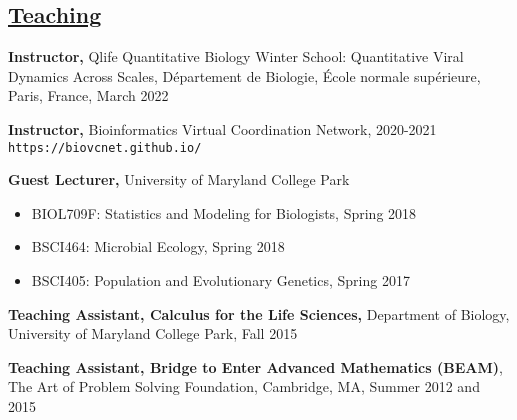 \documentclass[]{res}
\begin{document}
\begin{resume}


\section{\underline{Teaching}} \vspace{2mm}

{\bf Instructor,} Qlife Quantitative Biology Winter School: Quantitative Viral Dynamics Across Scales, D\'{e}partement de Biologie, \'{E}cole normale sup\'{e}rieure, Paris, France, March 2022

{\bf Instructor,} Bioinformatics Virtual Coordination Network, 2020-2021\\
\verb|https://biovcnet.github.io/|

{\bf Guest Lecturer,} University of Maryland College Park
\begin{itemize} \itemsep -2pt
\item BIOL709F: Statistics and Modeling for Biologists, Spring 2018
\item BSCI464: Microbial Ecology, Spring 2018 
\item BSCI405: Population and Evolutionary Genetics, Spring 2017
\end{itemize}

{\bf Teaching Assistant, Calculus for the Life Sciences,} Department of Biology, University of Maryland College Park, Fall 2015%

{\bf Teaching Assistant, Bridge to Enter Advanced Mathematics (BEAM)}, The Art of Problem Solving Foundation, Cambridge, MA, Summer 2012 and 2015 %


\end{resume}
\end{document}

